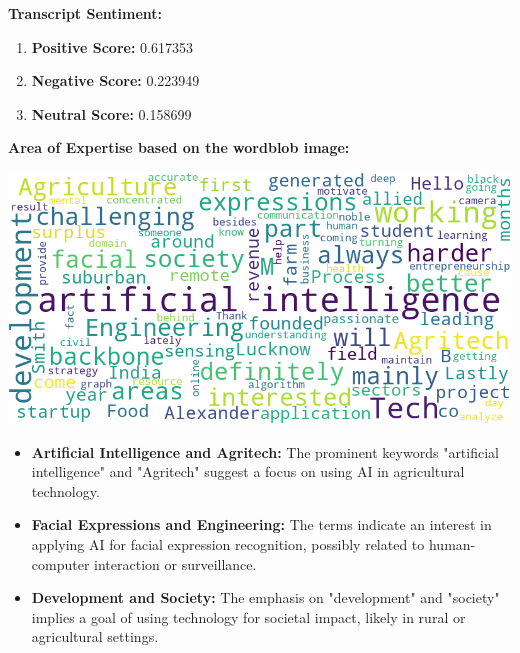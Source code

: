 \documentclass{article}
\begin{document}
\large{\textbf{Transcript Sentiment:}}
\begin{tcolorbox}[colback=red!5!white,colframe=red!75!black, fonttitle=\bfseries, title=Sentiment Breakdown]
    \begin{enumerate}
        \item \textbf{Positive Score:} \textcolor{green!70!black}{0.617353}
        \item \textbf{Negative Score:} \textcolor{red!70!black}{0.223949}
        \item \textbf{Neutral Score:} \textcolor{blue!70!black}{0.158699}
    \end{enumerate}
\end{tcolorbox}
\vspace{0.3in}
\LARGE \textbf{Area of Expertise based on the wordblob image:} \normalsize
\begin{center}
    \includegraphics[width=1\columnwidth]{images/wordcloud_9.png}
\end{center}

\begin{itemize}
    \item \textbf{Artificial Intelligence and Agritech:} The prominent keywords "artificial intelligence" and "Agritech" suggest a focus on using AI in agricultural technology.
    \item \textbf{Facial Expressions and Engineering:} The terms indicate an interest in applying AI for facial expression recognition, possibly related to human-computer interaction or surveillance.
    \item \textbf{Development and Society:} The emphasis on "development" and "society" implies a goal of using technology for societal impact, likely in rural or agricultural settings.
\end{itemize}
\end{document}
